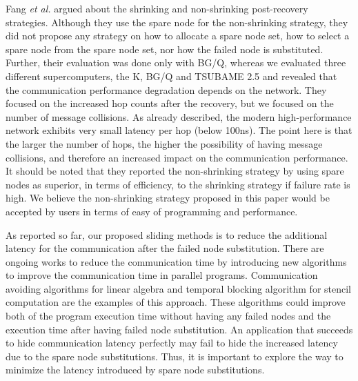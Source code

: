 \documentclass[Afour,times,sageh]{sagej}
\begin{document}
Fang {\it et al.} argued about the shrinking and
non-shrinking post-recovery strategies. Although they use the spare
node for the non-shrinking strategy, they did not propose any
strategy on how to allocate a spare node set, how to select a spare node from
the spare node set, nor how the failed node is substituted. Further,
their evaluation was done only with BG/Q, whereas we evaluated three
different supercomputers, the K, BG/Q and TSUBAME 2.5 and revealed
that the communication performance degradation depends on
the network. They focused on the increased hop counts after the
recovery,  but we focused on the number of message collisions. As
already described, the modern high-performance network
exhibits very small latency per hop (below 100ns). The point here is
that the larger the number of hops, the higher the possibility of
having message collisions, and therefore an increased impact on
the communication performance. It should be noted that they reported
the non-shrinking strategy by using spare nodes as superior, in terms
of efficiency, to the shrinking strategy if failure rate is high. We
believe the non-shrinking strategy proposed in this paper would be
accepted by users in terms of easy of programming and performance.

As reported so far, our proposed sliding methods is to reduce the
additional latency for the communication after the failed node
substitution. There are ongoing works to reduce the communication
time by introducing new algorithms to improve the communication time
in parallel programs. Communication avoiding
algorithms\citep{Demmel:2012:CPS:2340316.2340324} for linear algebra
and temporal blocking algorithm for stencil
computation\citep{MURANUSHI20151303} are the examples of this
approach.  
These algorithms could improve both of the program execution time
without  having any failed nodes and the execution time after having
failed node  substitution. An application that succeeds to hide
communication latency perfectly may fail to hide the increased
latency due to the spare node substitutions. Thus, it is important
to explore the way to minimize the latency introduced by spare node
substitutions. 
\end{document}
